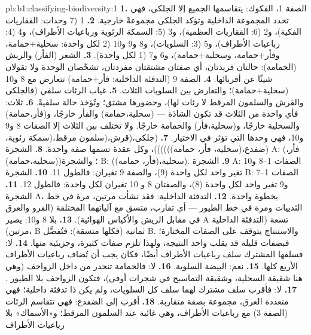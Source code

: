 \begin{solution}{pb:b1:classifying-biodiversity:1}
\textbf{1.} الصفة 1، الفكوك: يتقاسمها الجميع إلا الجلكى، فهي
تحدد المجموعة الداخلية وتؤكد الجلكى مجموعةً خارجية.
\textbf{2.} 1 (7 وحدات: الفقاريات الفكية)، و2 (6: الفقاريات العظمية)، و3
(5: السمكة الرئوية ورباعيات الأطراف)، و4 (4: رباعيات الأطراف)، و5 (3: السلويات)، و8 و9
و10 (2 لكل واحدة: سحلية+حمامة، وفأر+حمامة، وسحلية+حمامة)، و6 و7
(1 لكل واحدة).
\textbf{3.} الشعر (الفأر) والريش (الحمامة): حالتان فريدتان،
أي صفتان مشتقتان مفردتان، تشخّصان الوحدة ولا تقولان شيئًا عن
أقربائها.
\textbf{4.} الصفة 9 (التدفئة الداخلية: فأر+حمامة) تتعارض مع 8
و10 (سحلية+حمامة)؛ والتعارض بين السلويات الثلاث.
\textbf{5.} غياب الرئات سلفي (فالجلكى والقرش والسلمون
المرقط لا رئات لها)، وحضورها مشتق؛ وتُؤخذ حالة 
سلفيةً.
\textbf{6.} ثلاث: فأي واحدة من الثلاث قد تكون الشاذة ---
(سحلية،حمامة) والفأر خارجًا، و(فأر،حمامة) والسحلية
خارجًا، و(سحلية،فأر) والحمامة خارجًا. ولا تختلف بين الثلاث إلا الصفات 8 و9
و10، فهي وحدها التي تؤثر في الاختيار.
\textbf{7.} (جلكى،(قرش،(سلمون مرقط،(سمكة رئوية،(ضفدع،(سحلية، فأر،
حمامة))))))، وكل عقدة تسمها صفة واحدة.
\textbf{8.} الشجرة A: (فأر،(سحلية،حمامة))؛ والشجرة B: (سحلية،(فأر،
حمامة)).
\textbf{9.} الشجرة A: الصفات 1--8 و10 تغير واحد لكل واحدة (9)، والصفة
9 تغيران: فالطول \num{11}.
\textbf{10.} الشجرة B: الصفات 1--7 و9 تغير واحد لكل واحدة (8)، والصفتان 8 و
10 تغيران لكل واحدة: فالطول \num{12}.
\textbf{11.} الشجرة A، بخطوة واحدة.
\textbf{12.} التدفئة الداخلية: فقد نشأت مرتين، مرة في خط الثدييات
ومرة في خط الطيور --- أي تقارب، متسق مع آلياتهما
المختلفة (الفرو والعرق في مقابل الريش والأكياس الهوائية).
\textbf{13.} بلا 8 و10: يصير  A تسعة (التدفئة الداخلية مرتين)، 
B ثمانية (فكلها متسقة): فتُفضَّل B. والاستنتاج
يتوقف على الصفات المختارة؛ فبصفات قليلة قد يقلب  واحد
النتيجة، ولهذا تلزم صفات كثيرة، وجزيئية
منها.
\textbf{14.} لا: فسلفها المشترك سلف رباعيات
الأطراف أيضًا، فكان يجب أن تُضاف رباعيات الأطراف الأربع كلها.
\textbf{15.} نعم: البيضة السلوية.
\textbf{16.} لا: فالحمامة تنحدر من داخل الزواحف (وهي هنا
شقيقة السحلية، وشقيقة التماسيح في شجرات أوفى)، فتكون
الزواحف بلا الطيور .
\textbf{17.} لا: فأقرب سلف مشترك لهما سلف كل
السلويات، ولم يكن ذا تدفئة داخلية؛ فهي متعددة العرق، مجموعة بصفة
متقاربة.
\textbf{18.} أقرب إلى الضفدع: فهي تتقاسم الرئات (الصفة 3) مع
رباعيات الأطراف، وهي غائبة عند السلمون المرقط؛ و«الأسماك» بلا رباعيات الأطراف

\end{solution}
